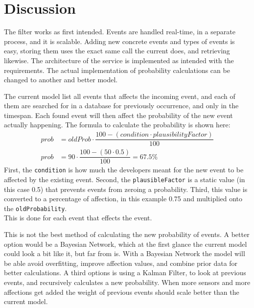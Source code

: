 \vspace{-5pt}
\section{Discussion}
\vspace{-5pt}

The filter works as first intended.
Events are handled real-time, in a separate process, and it is scalable.
Adding new concrete events and types of events is easy, storing them uses the exact same call the current does, and retrieving likewise.
The architecture of the service is implemented as intended with the requirements.
The actual implementation of probability calculations can be changed to another and better model.

The current model list all events that affects the incoming event, and each of them are searched for in a database for previously occurrence, and only in the timespan.
Each found event will then affect the probability of the new event actually happening.
The formula to calculate the probability is shown here:
\begin{align*}
prob &= oldProb \cdot \dfrac{100 - (condition \cdot plausibilityFactor)}{100} \\
prob &= 90 \cdot \dfrac{100 - (50 \cdot 0.5)}{100} = 67.5\%
\end{align*}
First, the \texttt{condition} is how much the developers meant for the new event to be affected by the existing event.
Second, the \texttt{plausibleFactor} is a static value (in this case 0.5) that prevents events from zeroing a probability.
Third, this value is converted to a percentage of affection, in this example 0.75 and multiplied onto the \texttt{oldProbability}.
\\
This is done for each event that effects the event.

This is not the best method of calculating the new probability of events.
A better option would be a Bayesian Network\cite{MicrosoftBayesian}, which at the first glance the current model could look a bit like it, but far from is.
With a Bayesian Network the model will be able avoid overfitting, improve affection values, and combine prior data for better calculations.
A third options is using a Kalman Filter\cite{welch2006introduction}, to look at previous events, and recursively calculates a new probability.
When more sensors and more affections get added the weight of previous events should scale better than the current model.

